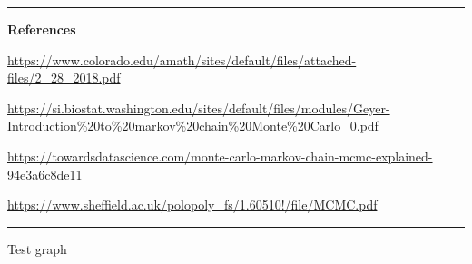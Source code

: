 \bigskip
\hrule
\textbf{\large References}

\url{https://www.colorado.edu/amath/sites/default/files/attached-files/2_28_2018.pdf}

\url{https://si.biostat.washington.edu/sites/default/files/modules/Geyer-Introduction\%20to\%20markov\%20chain\%20Monte\%20Carlo_0.pdf}

\url{https://towardsdatascience.com/monte-carlo-markov-chain-mcmc-explained-94e3a6c8de11}

\url{https://www.sheffield.ac.uk/polopoly_fs/1.60510!/file/MCMC.pdf}
\hrule

Test graph


